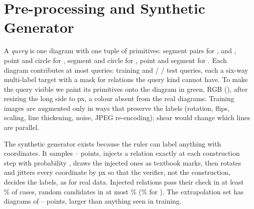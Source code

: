 \section{Pre-processing and Synthetic Generator}
\label{sec:preprocessing}

A \emph{query} is one diagram with one tuple of primitives: segment pairs for ,  and , point and circle for , segment and circle for , point and segment for . Each diagram contributes at most \queryCap{} queries: \nTrainQueries{} training and \nQueriesId{} / \nQueriesHo{} / \nQueriesEx{} test queries, each a six-way multi-label target with a mask for relations the query kind cannot have. To make the query visible we paint its primitives onto the diagram in green, RGB (\overlayRGB), after resizing the long side to  px, a colour absent from the real diagrams. Training images are augmented only in ways that preserve the labels (rotation, flips, scaling, line thickening, noise, JPEG re-encoding); shear would change which lines are parallel.

The synthetic generator exists because the ruler can label anything with coordinates. It samples \synthPointsMin--\synthPointsMax{} points, injects a relation exactly at each construction step with probability \synthInjectRate{}, draws the injected ones as textbook marks, then rotates and jitters every coordinate by \synthJitterPx{} px so that the verifier, not the construction, decides the labels, as for real data. Injected relations pass their check in at least \synthInjectedPassMinPct\% of cases, random candidates in at most \synthRandomPassMaxPct\% (\synthRandomPassEqualLengthPct\% for ). The extrapolation set has \synthExtrapSize{} diagrams of \synthExtrapPointsMin--\synthExtrapPointsMax{} points, larger than anything seen in training.
